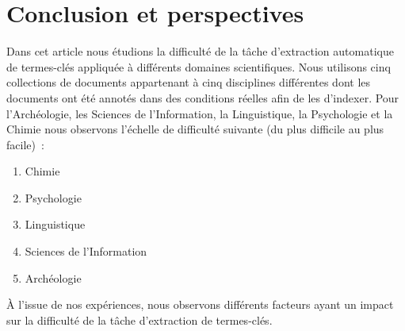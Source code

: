 \section{Conclusion et perspectives}
\label{sec:conclusion_et_perspectives}
  Dans cet article nous étudions la difficulté de la tâche d'extraction
  automatique de termes-clés appliquée à différents domaines scientifiques. Nous
  utilisons cinq collections de documents appartenant à cinq disciplines
  différentes dont les documents ont été annotés dans des conditions réelles
  afin de les d'indexer. Pour l'Archéologie, les Sciences de l'Information, la
  Linguistique, la Psychologie et la Chimie nous observons l'échelle de
  difficulté suivante (du plus difficile au plus facile)~:
  \begin{enumerate}
    \item{Chimie}
    \item{Psychologie}
    \item{Linguistique}
    \item{Sciences de l'Information}
    \item{Archéologie}
  \end{enumerate}

  À l'issue de nos expériences, nous observons différents facteurs ayant un
  impact sur la difficulté de la tâche d'extraction de termes-clés. 


